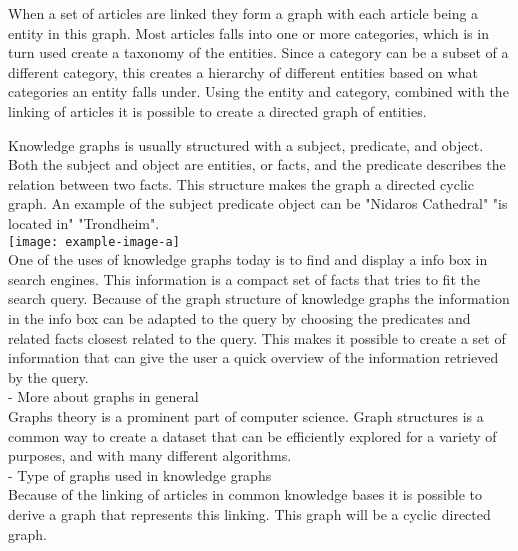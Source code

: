 When a set of articles are linked they form a graph with each article being a entity in this graph\cite{mahdisoltani:hal-01699874, hoffart2013yago2}. Most articles falls into one or more categories, which is in turn used create a taxonomy of the entities. Since a category can be a subset of a different category, this creates a hierarchy of different entities based on what categories an entity falls under. Using the entity and category, combined with the linking of articles it is possible to create a directed graph of entities.

Knowledge graphs is usually structured with a subject, predicate, and object. Both the subject and object are entities, or facts, and the predicate describes the relation between two facts. This structure makes the graph a directed cyclic graph. An example of the subject predicate object can be "Nidaros Cathedral" "is located in" "Trondheim".\\
\texttt{[image: example-image-a]}\\

One of the uses of knowledge graphs today is to find and display a info box in search engines. This information is a compact set of facts that tries to fit the search query. Because of the graph structure of knowledge graphs the information in the info box can be adapted to the query by choosing the predicates and related facts closest related to the query. This makes it possible to create a set of information that can give the user a quick overview of the information retrieved by the query.\\

- More about graphs in general\\
Graphs theory is a prominent part of computer science. Graph structures is a common way to create a dataset that can be efficiently explored for a variety of purposes, and with many different algorithms. \\

- Type of graphs used in knowledge graphs\\
Because of the linking of articles in common knowledge bases it is possible to derive a graph that represents this linking. This graph will be a cyclic directed graph.\\


